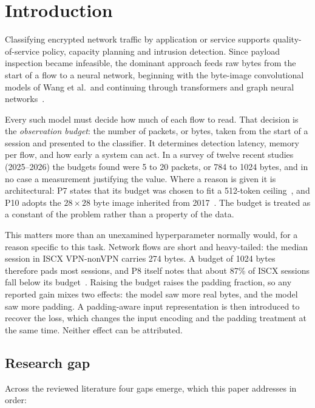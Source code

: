 \documentclass[pdflatex,sn-mathphys-num]{sn-jnl}
\theoremstyle{thmstyleone}%
\theoremstyle{thmstylethree}%
\begin{document}
\section{Introduction}\label{sec:intro}

Classifying encrypted network traffic by application or service supports
quality-of-service policy, capacity planning and intrusion detection. Since
payload inspection became infeasible, the dominant approach feeds raw bytes
from the start of a flow to a neural network, beginning with the byte-image
convolutional models of Wang et al.\ and continuing through transformers and
graph neural networks~\cite{p1,p4,p6,p9}.

Every such model must decide how much of each flow to read. That decision is
the \emph{observation budget}: the number of packets, or bytes, taken from the
start of a session and presented to the classifier. It determines detection
latency, memory per flow, and how early a system can act. In a survey of twelve
recent studies (2025--2026) the budgets found were 5 to 20 packets, or 784 to 1024
bytes, and in no case a measurement justifying the value. Where a reason is
given it is architectural: P7 states that its budget was chosen to fit a
512-token ceiling~\cite{p7}, and P10 adopts the $28\times28$ byte image inherited
from 2017~\cite{p10}. The budget is treated as a constant of the problem rather
than a property of the data.

This matters more than an unexamined hyperparameter normally would, for a
reason specific to this task. Network flows are short and heavy-tailed: the
median session in ISCX VPN-nonVPN carries 274 bytes. A budget of 1024 bytes
therefore pads most sessions, and P8 itself notes that about 87\% of ISCX
sessions fall below its budget~\cite{p8}. Raising the budget raises the padding
fraction, so any reported gain mixes two effects: the model saw more real
bytes, and the model saw more padding. A padding-aware input representation is
then introduced to recover the loss, which changes the input encoding and the
padding treatment at the same time. Neither effect can be attributed.

\subsection*{Research gap}

Across the reviewed literature four gaps emerge, which this paper addresses
in order:
\end{document}
